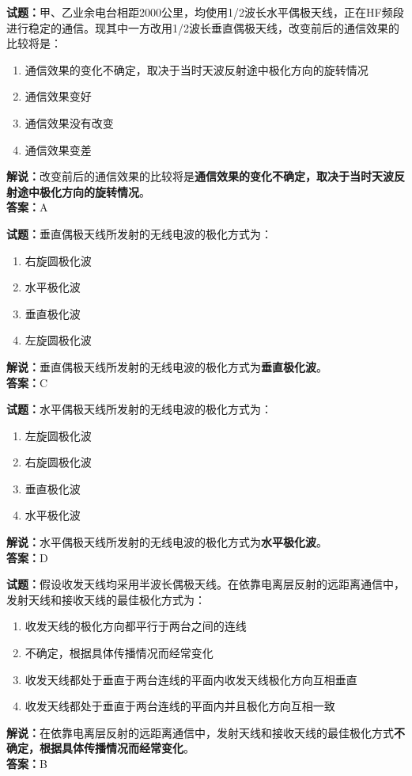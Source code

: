 \documentclass{ctexbook}
\begin{document}
\bigskip


\noindent\textbf{试题：}甲、乙业余电台相距2000公里，均使用1/2波长水平偶极天线，正在HF频段进行稳定的通信。现其中一方改用1/2波长垂直偶极天线，改变前后的通信效果的比较将是：
\begin{enumerate}[leftmargin=3em]
\item 通信效果的变化不确定，取决于当时天波反射途中极化方向的旋转情况
\item 通信效果变好
\item 通信效果没有改变
\item 通信效果变差
\end{enumerate}
\noindent\textbf{解说：}改变前后的通信效果的比较将是\textbf{通信效果的变化不确定，取决于当时天波反射途中极化方向的旋转情况}。\\\noindent\textbf{答案：}A



\bigskip


\noindent\textbf{试题：}垂直偶极天线所发射的无线电波的极化方式为：
\begin{enumerate}[leftmargin=3em]
\item 右旋圆极化波
\item 水平极化波
\item 垂直极化波
\item 左旋圆极化波
\end{enumerate}
\noindent\textbf{解说：}垂直偶极天线所发射的无线电波的极化方式为\textbf{垂直极化波}。\\\noindent\textbf{答案：}C



\bigskip


\noindent\textbf{试题：}水平偶极天线所发射的无线电波的极化方式为：
\begin{enumerate}[leftmargin=3em]
\item 左旋圆极化波
\item 右旋圆极化波
\item 垂直极化波
\item 水平极化波
\end{enumerate}
\noindent\textbf{解说：}水平偶极天线所发射的无线电波的极化方式为\textbf{水平极化波}。\\\noindent\textbf{答案：}D



\bigskip


\noindent\textbf{试题：}假设收发天线均采用半波长偶极天线。在依靠电离层反射的远距离通信中，发射天线和接收天线的最佳极化方式为：
\begin{enumerate}[leftmargin=3em]
\item 收发天线的极化方向都平行于两台之间的连线
\item 不确定，根据具体传播情况而经常变化
\item 收发天线都处于垂直于两台连线的平面内收发天线极化方向互相垂直
\item 收发天线都处于垂直于两台连线的平面内并且极化方向互相一致
\end{enumerate}
\noindent\textbf{解说：}在依靠电离层反射的远距离通信中，发射天线和接收天线的最佳极化方式\textbf{不确定，根据具体传播情况而经常变化}。\\\noindent\textbf{答案：}B
\end{document}
